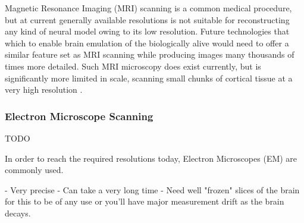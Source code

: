 Magnetic Resonance Imaging (MRI) scanning is a common medical procedure, but at
current generally available resolutions is not suitable for reconstructing any
kind of neural model owing to its low resolution. Future technologies that which
to enable brain emulation of the biologically alive would need to offer a
similar feature set as MRI scanning while producing images many thousands of
times more detailed. Such MRI microscopy does exist currently, but is
significantly more limited in scale, scanning small chunks of cortical tissue at
a very high resolution
\autocite{johnson_three-dimensional_1987,bostrom_whole_2008}.

\subsubsection*{Electron Microscope Scanning}

TODO

In order to reach the required resolutions today, Electron Microscopes (EM) are
commonly used. 

- Very precise
- Can take a very long time
- Need well "frozen" slices of the brain for this to be of any use or you'll
have major measurement drift as the brain decays.

